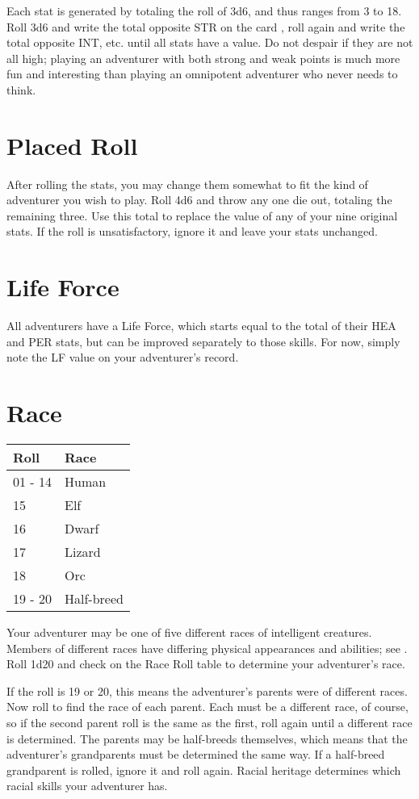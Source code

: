Each stat is generated by totaling the roll of 3d6, and thus ranges from 3 to 18. Roll 3d6 and write the total opposite STR on the card , roll again and write the total opposite INT, etc. until all stats have a value. Do not despair if they are not all high; playing an adventurer with both strong and weak points is much more fun and interesting than playing an omnipotent adventurer who never needs to think.
\section{Placed Roll}
After rolling the stats, you may change them somewhat to fit the kind of adventurer you wish to play. Roll 4d6 and throw any one die out, totaling the remaining three. Use this total to replace the value of any of your nine original stats. If the roll is unsatisfactory, ignore it and leave your stats unchanged.
\section{Life Force}
All adventurers have a Life Force, which starts equal to the total of their HEA and PER stats, but can be improved separately to those skills. For now, simply note the LF value on your adventurer's record.
\section{Race}

\begin{normbox}
\small
\begin{tabular}{@{}l l}
\textbf{Roll} & \textbf{Race}\\
\midrule
01 - 14 & Human\\
15 & Elf\\
16 & Dwarf \\
17 & Lizard\\
18 & Orc\\
19 - 20 & Half-breed
\end{tabular}
\end{normbox}\smallskip
Your adventurer may be one of five different races of intelligent creatures. Members of different races have differing physical appearances and abilities; see . Roll 1d20 and check on the Race Roll table to determine your adventurer's race.

If the roll is 19 or 20, this means the adventurer's parents were of different races. Now roll to find the race of each parent. Each must be a different race, of course, so if the second parent roll is the same as the first, roll again until a different race is determined. The parents may be half-breeds themselves, which means that the adventurer's grandparents must be determined the same way. If a half-breed grandparent is rolled, ignore it and roll again. Racial heritage determines which racial skills your adventurer has. 

